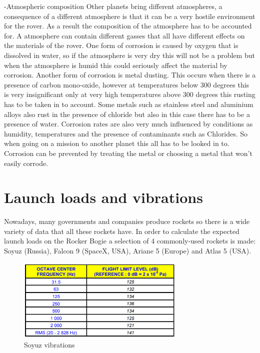 -Atmospheric composition
Other planets bring different atmospheres, a consequence of a different atmosphere is that it can be a very hostile environment for the rover. As a result the composition of the atmosphere has to be accounted for. A atmosphere can contain different gasses that all have different effects on the materials of the rover. 
One form of corrosion is caused by oxygen that is dissolved in water, so if the atmosphere is very dry this will not be a problem but when the atmosphere is humid this could seriously affect the material by corrosion. 
Another form of corrosion is metal dusting. This occurs when there is a presence of carbon mono-oxide, however at temperatures below 300 degrees this is very insignificant only at very high temperatures above 300 degrees this rusting has to be taken in to account.
Some  metals such as stainless steel and aluminium alloys also rust in the presence of chloride but also in this case there has to be a presence of water. 
Corrosion rates are also very much influenced by conditions as humidity, temperatures and the presence of contaminants such as Chlorides. So when going on a mission to another planet this all has to be looked in to. Corrosion can be prevented by treating the metal or choosing a metal that won't easily corrode.



\section{Launch loads and vibrations}

Nowadays, many governments and companies produce rockets so there is a wide variety of data that all these rockets have. In order to calculate the expected launch loads on the Rocker Bogie a selection of 4 commonly-used rockets is made: Soyuz (Russia), Falcon 9 (SpaceX, USA), Ariane 5 (Europe) and Atlas 5 (USA).

\begin{figure}[h!]
\centering
\includegraphics[width=8cm]{figures/Soyux_vibra.png}
\caption{Soyuz vibrations}
\label{Soyuz vibrations}
\end{figure}

